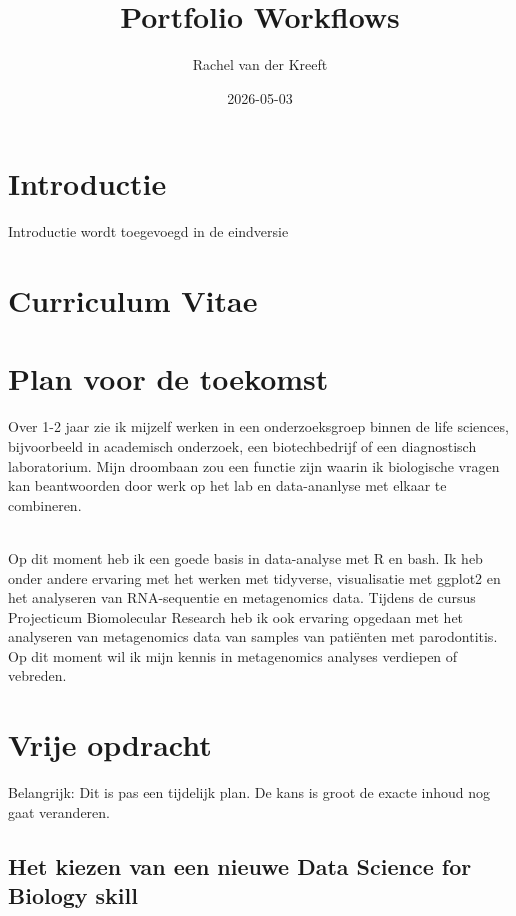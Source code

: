 \documentclass[
]{book}
\title{Portfolio Workflows}
\author{Rachel van der Kreeft}
\date{2026-05-03}
\begin{document}
\maketitle

{
\setcounter{tocdepth}{1}
\tableofcontents
}
\chapter{Introductie}\label{introductie}

Introductie wordt toegevoegd in de eindversie

\chapter{Curriculum Vitae}\label{curriculum-vitae}

\chapter{Plan voor de toekomst}\label{plan-voor-de-toekomst}

Over 1-2 jaar zie ik mijzelf werken in een onderzoeksgroep binnen de life sciences, bijvoorbeeld in academisch onderzoek, een biotechbedrijf of een diagnostisch laboratorium. Mijn droombaan zou een functie zijn waarin ik biologische vragen kan beantwoorden door werk op het lab en data-ananlyse met elkaar te combineren.\\
\strut \\
Op dit moment heb ik een goede basis in data-analyse met R en bash. Ik heb onder andere ervaring met het werken met tidyverse, visualisatie met ggplot2 en het analyseren van RNA-sequentie en metagenomics data. Tijdens de cursus Projecticum Biomolecular Research heb ik ook ervaring opgedaan met het analyseren van metagenomics data van samples van patiënten met parodontitis. Op dit moment wil ik mijn kennis in metagenomics analyses verdiepen of vebreden.

\chapter{Vrije opdracht}\label{vrije-opdracht}

\hfill\break
\hfill\break
Belangrijk: Dit is pas een tijdelijk plan. De kans is groot de exacte inhoud nog gaat veranderen.\\

\section{Het kiezen van een nieuwe Data Science for Biology skill}\label{het-kiezen-van-een-nieuwe-data-science-for-biology-skill}
\end{document}
